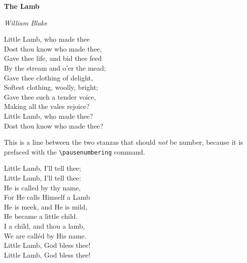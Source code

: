 \documentclass{memoir}
\begin{document}
\textbf{The Lamb}

\emph{William Blake}

\begingroup
\beginnumbering
{}

\pstart
Little Lamb, who made thee\\
Dost thou know who made thee,\\
Gave thee life, and bid thee feed\\
By the stream and o'er the mead;\\
Gave thee clothing of delight,\\
Softest clothing, woolly, bright;\\
Gave thee such a tender voice,\\
Making all the vales rejoice?\\
Little Lamb, who made thee?\\
Dost thou know who made thee?
\pend

This is a line between the two stanzas that should \emph{not} be number, because it is prefaced with the \verb|\pausenumbering| command.

\pstart
Little Lamb, I'll tell thee;\\
Little Lamb, I'll tell thee:\\
He is called by thy name,\\
For He calls Himself a Lamb\\
He is meek, and He is mild,\\
He became a little child.\\
I a child, and thou a lamb,\\
We are call\'ed by His name.\\
Little Lamb, God bless thee!\\
Little Lamb, God bless thee!
\pend

\endnumbering
\endgroup
\end{document}

